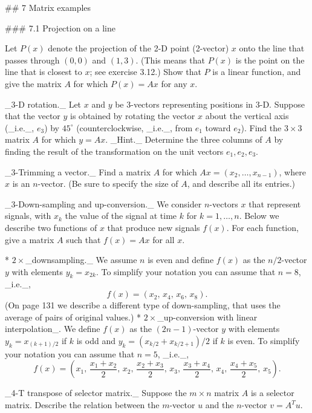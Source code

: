 

## 7 Matrix examples

### 7.1 Projection on a line

Let \(P(x)\) denote the projection of the 2-D point (2-vector) \(x\) onto the line that passes through \((0,0)\) and \((1,3)\). (This means that \(P(x)\) is the point on the line that is closest to \(x\); see exercise 3.12.) Show that \(P\) is a linear function, and give the matrix \(A\) for which \(P(x)=Ax\) for any \(x\).

_3-D rotation._ Let \(x\) and \(y\) be 3-vectors representing positions in 3-D. Suppose that the vector \(y\) is obtained by rotating the vector \(x\) about the vertical axis (_i.e._, \(e_{3}\)) by \(45^{\circ}\) (counterclockwise, _i.e._, from \(e_{1}\) toward \(e_{2}\)). Find the \(3\times 3\) matrix \(A\) for which \(y=Ax\). _Hint._ Determine the three columns of \(A\) by finding the result of the transformation on the unit vectors \(e_{1},e_{2},e_{3}\).

_3-Trimming a vector._ Find a matrix \(A\) for which \(Ax=(x_{2},\ldots,x_{n-1})\), where \(x\) is an \(n\)-vector. (Be sure to specify the size of \(A\), and describe all its entries.)

_3-Down-sampling and up-conversion._ We consider \(n\)-vectors \(x\) that represent signals, with \(x_{k}\) the value of the signal at time \(k\) for \(k=1,\ldots,n\). Below we describe two functions of \(x\) that produce new signals \(f(x)\). For each function, give a matrix \(A\) such that \(f(x)=Ax\) for all \(x\).

* \(2\times\)_downsampling._ We assume \(n\) is even and define \(f(x)\) as the \(n/2\)-vector \(y\) with elements \(y_{k}=x_{2k}\). To simplify your notation you can assume that \(n=8\), _i.e._, \[f(x)=(x_{2},\,x_{4},\,x_{6},\,x_{8}).\] (On page 131 we describe a different type of down-sampling, that uses the average of pairs of original values.)
* \(2\times\)_up-conversion with linear interpolation_. We define \(f(x)\) as the \((2n-1)\)-vector \(y\) with elements \(y_{k}=x_{(k+1)/2}\) if \(k\) is odd and \(y_{k}=(x_{k/2}+x_{k/2+1})/2\) if \(k\) is even. To simplify your notation you can assume that \(n=5\), _i.e._, \[f(x)=\left(x_{1},\,\frac{x_{1}+x_{2}}{2},\,x_{2},\,\frac{x_{2}+x_{3}}{2},\,x_ {3},\,\frac{x_{3}+x_{4}}{2},\,x_{4},\,\frac{x_{4}+x_{5}}{2},\,x_{5}\right).\]

_4-T transpose of selector matrix._ Suppose the \(m\times n\) matrix \(A\) is a selector matrix. Describe the relation between the \(m\)-vector \(u\) and the \(n\)-vector \(v=A^{T}u\).

